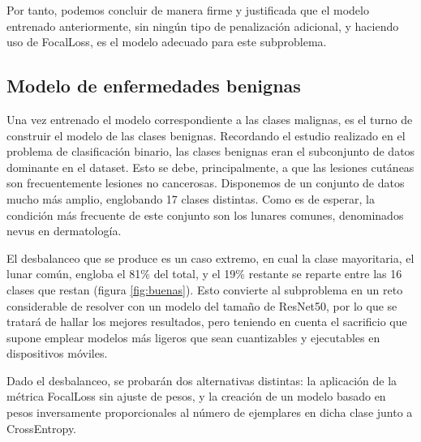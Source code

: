 Por tanto, podemos concluir de manera firme y justificada que el modelo entrenado anteriormente, sin ningún tipo de penalización adicional, y haciendo uso de FocalLoss, es el modelo adecuado para este subproblema.

\subsection{Modelo de enfermedades benignas}
\label{sec:benigncapt5}

Una vez entrenado el modelo correspondiente a las clases malignas, es el turno de construir el modelo de las clases benignas. Recordando el estudio realizado en el problema de clasificación binario, las clases benignas eran el subconjunto de datos dominante en el dataset. Esto se debe, principalmente, a que las lesiones cutáneas son frecuentemente lesiones no cancerosas. Disponemos de un conjunto de datos mucho más amplio, englobando 17 clases distintas.  Como es de esperar, la condición más frecuente de este conjunto son los lunares comunes, denominados nevus en dermatología.

El desbalanceo que se produce es un caso extremo, en cual la clase mayoritaria, el lunar común, engloba el 81\% del total, y el 19\% restante se reparte entre las 16 clases que restan (figura  \ref{fig:buenas}). Esto convierte al subproblema en un reto considerable de resolver con un modelo del tamaño de ResNet50, por lo que se tratará de hallar los mejores resultados, pero teniendo en cuenta el sacrificio que supone emplear modelos más ligeros que sean cuantizables y ejecutables en dispositivos móviles.

Dado el desbalanceo, se probarán dos alternativas distintas: la aplicación de la métrica FocalLoss sin ajuste de pesos, y la creación de un modelo basado en pesos inversamente proporcionales al número de ejemplares en dicha clase junto a CrossEntropy.

